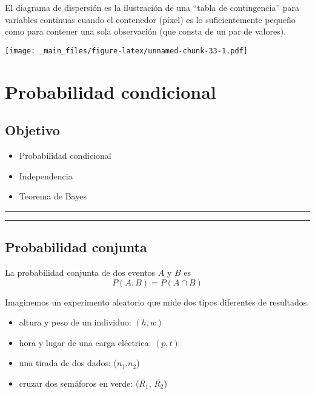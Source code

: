 \documentclass[
]{book}
\providecommand{\tightlist}{%
  \setlength{\itemsep}{0pt}\setlength{\parskip}{0pt}}
\begin{document}
El diagrama de dispersión es la ilustración de una ``tabla de contingencia'' para variables continuas cuando el contenedor (píxel) es lo suficientemente pequeño como para contener una sola observación (que consta de un par de valores).

\texttt{[image: \_main\_files/figure-latex/unnamed-chunk-33-1.pdf]}

\hypertarget{probabilidad-condicional}{%
\chapter{Probabilidad condicional}\label{probabilidad-condicional}}

\hypertarget{objetivo-3}{%
\section{Objetivo}\label{objetivo-3}}

\begin{itemize}
\tightlist
\item
  Probabilidad condicional
\item
  Independencia
\item
  Teorema de Bayes
\end{itemize}

\begin{center}\rule{0.5\linewidth}{0.5pt}\end{center}

\begin{center}\rule{0.5\linewidth}{0.5pt}\end{center}

\hypertarget{probabilidad-conjunta}{%
\section{Probabilidad conjunta}\label{probabilidad-conjunta}}

La probabilidad conjunta de dos eventos \(A\) y \(B\) es
\[P(A,B)=P(A \cap B)\]

Imaginemos un experimento aleatorio que mide dos tipos diferentes de resultados.

\begin{itemize}
\item
  altura y peso de un individuo: \((h, w)\)
\item
  hora y lugar de una carga eléctrica: \((p, t)\)
\item
  una tirada de dos dados: (\(n_1\),\(n_2\))
\item
  cruzar dos semáforos en verde: (\(\bar{R_1}\), \(\bar{R_2}\))
\end{itemize}
\end{document}
